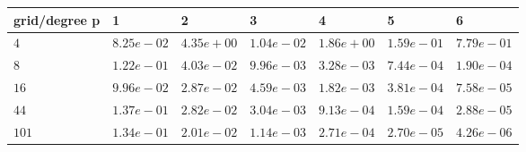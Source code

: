 \begin{tabular}{lllllll}
\hline
 grid/degree p   & 1          & 2          & 3          & 4          & 5          & 6          \\
\hline
 $4$             & $8.25e-02$ & $4.35e+00$ & $1.04e-02$ & $1.86e+00$ & $1.59e-01$ & $7.79e-01$ \\
 $8$             & $1.22e-01$ & $4.03e-02$ & $9.96e-03$ & $3.28e-03$ & $7.44e-04$ & $1.90e-04$ \\
 $16$            & $9.96e-02$ & $2.87e-02$ & $4.59e-03$ & $1.82e-03$ & $3.81e-04$ & $7.58e-05$ \\
 $44$            & $1.37e-01$ & $2.82e-02$ & $3.04e-03$ & $9.13e-04$ & $1.59e-04$ & $2.88e-05$ \\
 $101$           & $1.34e-01$ & $2.01e-02$ & $1.14e-03$ & $2.71e-04$ & $2.70e-05$ & $4.26e-06$ \\
\hline
\end{tabular}